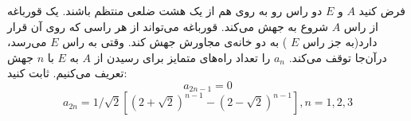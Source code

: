 \EXERCISE
فرض کنید
$A$
و
$E$
دو راس رو به روی هم از یک هشت ضلعی منتظم باشند. یک قورباغه از راس
$A$
شروع به جهش می‌کند. قورباغه می‌تواند از هر راسی که روی آن قرار دارد(به جز راس
$E$
) به دو خانه‌ی مجاورش جهش کند. وقتی به راس
$E$
می‌رسد، درآن‌جا توقف می‌کند.
$a_n$
را تعداد راه‌های متمایز برای رسیدن از
$A$
به
$E$
با
$n$
جهش تعریف می‌کنیم. ثابت کنید:
$$a_{2n-1} = 0$$
$$a_{2n} = 1 / \sqrt{2}[(2 + \sqrt{2})^{n-1} - (2 - \sqrt{2})^{n-1}], n = 1, 2, 3$$
